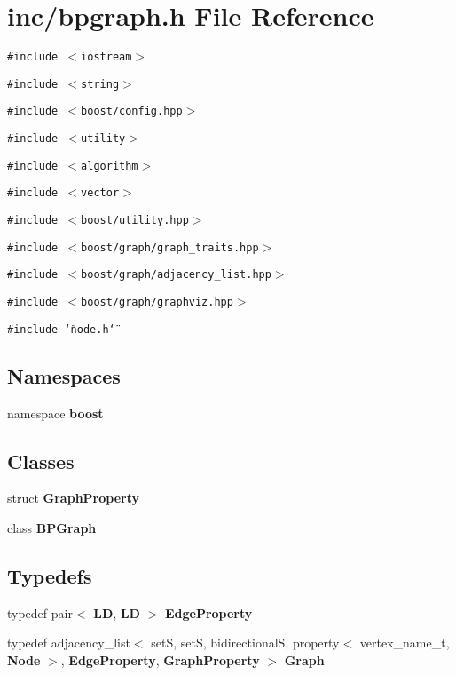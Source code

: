 \section{inc/bpgraph.h File Reference}
\label{bpgraph_8h}
{\tt \#include $<$iostream$>$}\par
{\tt \#include $<$string$>$}\par
{\tt \#include $<$boost/config.hpp$>$}\par
{\tt \#include $<$utility$>$}\par
{\tt \#include $<$algorithm$>$}\par
{\tt \#include $<$vector$>$}\par
{\tt \#include $<$boost/utility.hpp$>$}\par
{\tt \#include $<$boost/graph/graph\_\-traits.hpp$>$}\par
{\tt \#include $<$boost/graph/adjacency\_\-list.hpp$>$}\par
{\tt \#include $<$boost/graph/graphviz.hpp$>$}\par
{\tt \#include \char`\"{}node.h\char`\"{}}\par
\subsection*{Namespaces}
\begin{CompactItemize}
\item 
namespace {\bf boost}
\end{CompactItemize}
\subsection*{Classes}
\begin{CompactItemize}
\item 
struct {\bf GraphProperty}
\item 
class {\bf BPGraph}
\end{CompactItemize}
\subsection*{Typedefs}
\begin{CompactItemize}
\item 
typedef pair$<$ {\bf LD}, {\bf LD} $>$ {\bf EdgeProperty}
\item 
typedef adjacency\_\-list$<$ setS, setS, bidirectionalS, property$<$ vertex\_\-name\_\-t, {\bf Node} $>$, {\bf EdgeProperty}, {\bf GraphProperty} $>$ {\bf Graph}
\end{CompactItemize}


